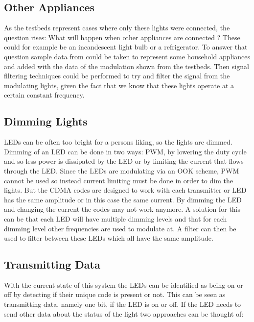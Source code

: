 	\subsection{Other Appliances}

	As the testbeds represent cases where only these lights were connected, the question rises: What will happen when other appliances are connected ?
	These could for example be an incandescent light bulb or a refrigerator.
	To answer that question sample data from \cite{kolter2011redd} could be taken to represent some household appliances and added with the data of the modulation shown from the testbeds.
	Then signal filtering techniques could be performed to try and filter the signal from the modulating lights, given the fact that we know that these lights operate at a certain constant frequency.


	\subsection{Dimming Lights}

	LEDs can be often too bright for a persons liking, so the lights are dimmed.
	Dimming of an LED can be done in two ways: PWM, by lowering the duty cycle and so less power is dissipated by the LED or by limiting the current that flows through the LED.
	Since the LEDs are modulating via an OOK scheme, PWM cannot be used so instead current limiting must be done in order to dim the lights.
	But the CDMA codes are designed to work with each transmitter or LED has the same amplitude or in this case the same current.
	By dimming the LED and changing the current the codes may not work anymore.
	A solution for this can be that each LED will have multiple dimming levels and that for each dimming level other frequencies are used to modulate at.
	A filter can then be used to filter between these LEDs which all have the same amplitude.



	\subsection{Transmitting Data}

	With the current state of this system the LEDs can be identified as being on or off by detecting if their unique code is present or not.
	This can be seen as transmitting data, namely one bit, if the LED is on or off.
	If the LED needs to send other data about the status of the light two approaches can be thought of: 


